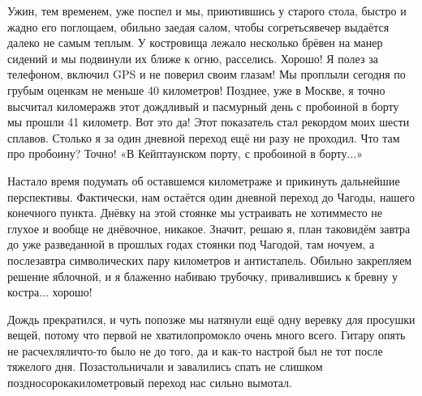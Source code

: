 Ужин, тем временем, уже поспел и мы, приютившись у старого стола, быстро и жадно его поглощаем, обильно заедая салом, чтобы согреться\mdash вечер выдаётся далеко не самым теплым. У костровища лежало несколько брёвен на манер сидений и мы подвинули их ближе к огню, расселись. Хорошо! Я полез за телефоном, включил GPS и не поверил своим глазам! Мы проплыли сегодня по грубым оценкам не меньше 40 километров! Позднее, уже в Москве, я точно высчитал киломераж\mdash в этот дождливый и пасмурный день с пробоиной в борту мы прошли 41 километр. Вот это да! Этот показатель стал рекордом моих шести сплавов. Столько я за один дневной переход ещё ни разу не проходил. Что там про пробоину? Точно! «В Кейптаунском порту, с пробоиной в борту$\ldots$»

Настало время подумать об оставшемся километраже и прикинуть дальнейшие перспективы. Фактически, нам остаётся один дневной переход до Чагоды, нашего конечного пункта. Днёвку на этой стоянке мы устраивать не хотим\mdash место не глухое и вообще не днёвочное, никакое. Значит, решаю я, план таков\mdash идём завтра до уже разведанной в прошлых годах стоянки под Чагодой, там ночуем, а послезавтра символических пару километров и антистапель. Обильно закрепляем решение яблочной, и я блаженно набиваю трубочку, привалившись к бревну у костра$\ldots$ хорошо! 

Дождь прекратился, и чуть попозже мы натянули ещё одну веревку для просушки вещей, потому что первой не хватило\mdash промокло очень много всего. Гитару опять не расчехляли\mdash что-то было не до того, да и как-то настрой был не тот после тяжелого дня. Позастольничали и завалились спать не слишком поздно\mdash сорокакилометровый переход нас сильно вымотал.

\begin{center}
\end{center}
